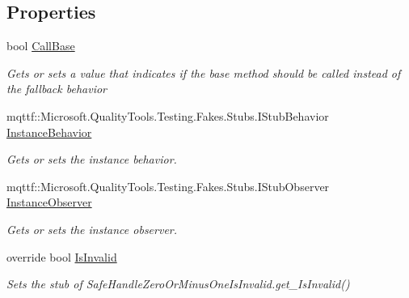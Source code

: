 \subsection*{Properties}
\begin{DoxyCompactItemize}
\item 
bool \hyperlink{class_microsoft_1_1_win32_1_1_safe_handles_1_1_fakes_1_1_stub_safe_handle_zero_or_minus_one_is_invalid_ad9d0972951873e36cbad6fdb3b528130}{Call\-Base}
\begin{DoxyCompactList}\small\item\em Gets or sets a value that indicates if the base method should be called instead of the fallback behavior\end{DoxyCompactList}\item 
mqttf\-::\-Microsoft.\-Quality\-Tools.\-Testing.\-Fakes.\-Stubs.\-I\-Stub\-Behavior \hyperlink{class_microsoft_1_1_win32_1_1_safe_handles_1_1_fakes_1_1_stub_safe_handle_zero_or_minus_one_is_invalid_a4701567d3ac3e76024b550f1c4b31f47}{Instance\-Behavior}
\begin{DoxyCompactList}\small\item\em Gets or sets the instance behavior.\end{DoxyCompactList}\item 
mqttf\-::\-Microsoft.\-Quality\-Tools.\-Testing.\-Fakes.\-Stubs.\-I\-Stub\-Observer \hyperlink{class_microsoft_1_1_win32_1_1_safe_handles_1_1_fakes_1_1_stub_safe_handle_zero_or_minus_one_is_invalid_a546e872b20dc59d56bff76140c5a5a3b}{Instance\-Observer}
\begin{DoxyCompactList}\small\item\em Gets or sets the instance observer.\end{DoxyCompactList}\item 
override bool \hyperlink{class_microsoft_1_1_win32_1_1_safe_handles_1_1_fakes_1_1_stub_safe_handle_zero_or_minus_one_is_invalid_a1c6daf2fb0ec62b9d18007f69c6f1f86}{Is\-Invalid}
\begin{DoxyCompactList}\small\item\em Sets the stub of Safe\-Handle\-Zero\-Or\-Minus\-One\-Is\-Invalid.\-get\-\_\-\-Is\-Invalid()\end{DoxyCompactList}\end{DoxyCompactItemize}


